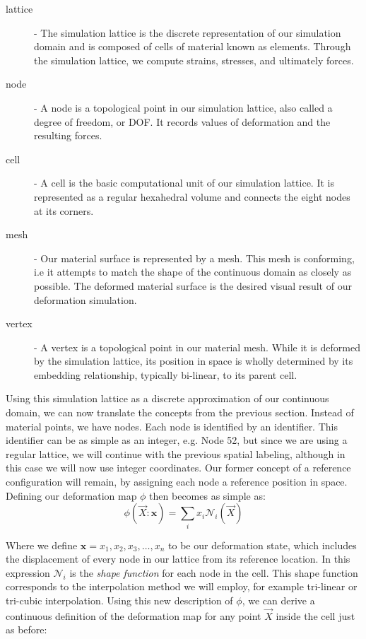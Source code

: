 \begin{description}
\item[lattice] - The simulation lattice is the discrete representation
  of our simulation domain and is composed of cells of material known
  as elements. Through the simulation lattice, we compute strains,
  stresses, and ultimately forces.
\item[node] - A node is a topological point in our simulation lattice,
  also called a degree of freedom, or DOF. It records values of
  deformation and the resulting forces.
\item[cell] - A cell is the basic computational unit of our simulation
  lattice. It is represented as a regular hexahedral volume and
  connects the eight nodes at its corners.
\item[mesh] - Our material surface is represented by a mesh. This mesh
  is conforming, i.e it attempts to match the shape of the continuous
  domain as closely as possible. The deformed material surface is the
  desired visual result of our deformation simulation.
\item[vertex] - A vertex is a topological point in our material
  mesh. While it is deformed by the simulation lattice, its position
  in space is wholly determined by its embedding relationship,
  typically bi-linear, to its parent cell.
\end{description}

Using this simulation lattice as a discrete approximation of our
continuous domain, we can now translate the concepts from the previous
section. Instead of material points, we have nodes. Each node is
identified by an identifier. This identifier can be as simple as an
integer, e.g. Node 52, but since we are using a regular lattice, we
will continue with the previous spatial labeling, although in this case we
will now use integer coordinates. Our former concept of a reference
configuration will remain, by assigning each node a reference position
in space. Defining our deformation map $\phi$ then becomes as
simple as:
\begin{equation}
  \label{equ:discretedeformationmap}
  \phi(\vec{X}:\mathbf x) = \sum_i x_i \mathcal N_i(\vec{X})
\end{equation}

Where we define $\mathbf x = {x_1, x_2, x_3, \ldots, x_n}$ to be our
deformation state, which includes the displacement of every node in
our lattice from its reference location. In this expression
$\mathcal N_i$ is the \textit{shape function} for each node in the
cell. This shape function corresponds to the interpolation method we
will employ, for example tri-linear or tri-cubic interpolation. Using this
new description of $\phi$, we can derive a continuous definition of the
deformation map for any point $\vec{X}$ inside the cell just as
before:

